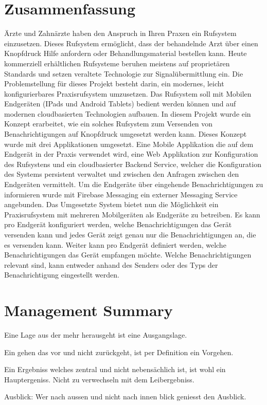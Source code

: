 \section*{Zusammenfassung}

Ärzte und Zahnärzte haben den Anspruch in Ihren Praxen ein Rufsystem einzusetzen.
Dieses Rufsystem ermöglicht, dass der behandelnde Arzt über einen Knopfdruck Hilfe anfordern oder Behandlungsmaterial bestellen kann.
Heute kommerziell erhältlichen Rufsysteme beruhen meistens auf proprietären Standards und setzen veraltete Technologie zur Signalübermittlung ein. \cite{TODO: Add Citation!}
Die Problemstellung für dieses Projekt besteht darin, ein modernes, leicht konfigurierbares Praxisrufsystem umzusetzen.
Das Rufsystem soll mit Mobilen Endgeräten (IPads und Android Tablets) bedient werden können und auf modernen cloudbasierten Technologien aufbauen.
In diesem Projekt wurde ein Konzept erarbeitet, wie ein solches Rufsystem zum Versenden von Benachrichtigungen auf Knopfdruck umgesetzt werden kann.
Dieses Konzept wurde mit drei Applikationen umgesetzt.
Eine Mobile Applikation die auf dem Endgerät in der Praxis verwendet wird, eine Web Applikation zur Konfiguration des Rufsystens
und ein cloudbasierter Backend Service, welcher die Konfiguration des Systems persistent verwaltet und zwischen den Anfragen zwischen den Endgeräten vermittelt.
Um die Endgeräte über eingehende Benachrichtigungen zu informieren wurde mit Firebase Messaging ein externer Messaging Service angebunden.
Das Umgesetzte System bietet nun die Möglichkeit ein Praxisrufsystem mit mehreren Mobilgeräten als Endgeräte zu betreiben.
Es kann pro Endgerät konfiguriert werden, welche Benachrichtigungen das Gerät versenden kann und jedes Gerät zeigt genau nur die Benachrichtigungen an, die es versenden kann.
Weiter kann pro Endgerät definiert werden, welche Benachrichtigungen das Gerät empfangen möchte.
Welche Benachrichtigungen relevant sind, kann entweder anhand des Senders oder des Typs der Benachrichtigung eingestellt werden.



\clearpage
\section*{Management Summary}

Eine Lage aus der mehr herausgeht ist eine Ausgangslage.

Ein gehen das vor und nicht zurückgeht, ist per Definition ein Vorgehen.

Ein Ergebniss welches zentral und nicht nebensächlich ist, ist wohl ein Hauptergeniss.
Nicht zu verwechseln mit dem Leibergebniss.

Ausblick: Wer nach aussen und nicht nach innen blick geniesst den Ausblick.

\clearpage
